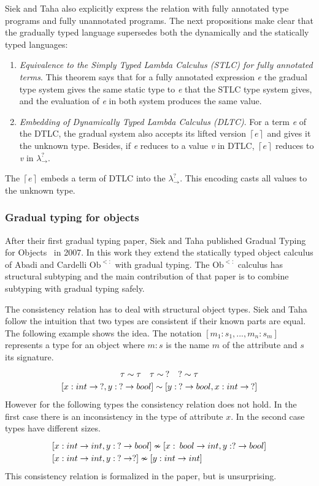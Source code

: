 \documentclass{article}
\newcommand\gstlc[0]{$\lambda^?_{\rightarrow}$}
\newcommand\obj[0]{$\text{Ob}^{<:}$}
\begin{document}
Siek and Taha also explicitly express the relation with fully annotated type programs and fully unannotated programs.  The next propositions make clear that the gradually typed language supersedes both the dynamically and the statically typed languages:
\begin{enumerate}
	\item \emph{Equivalence to the Simply Typed Lambda Calculus (STLC) for fully annotated terms}. This theorem says that for a fully annotated expression \emph{e} the gradual type system gives the same static type to \emph{e} that the STLC type system gives, and the evaluation of \emph{e} in both system produces the same value.
	\item \emph{Embedding of Dynamically Typed Lambda Calculus (DLTC)}. For a term \emph{e} of the DTLC, the gradual system also accepts its lifted version \emph{$\left\lceil e\right\rceil$} and gives it the unknown type. Besides, if \emph{e} reduces to a value \emph{v} in DTLC, \emph{$\left\lceil e\right\rceil$} reduces to \emph{v} in \gstlc.	
\end{enumerate} 
The \emph{$\left\lceil e\right\rceil$} embeds a term of DTLC into the \gstlc. This encoding casts all values to the unknown type. 

\subsubsection{Gradual typing for objects}
After their first gradual typing paper, Siek and Taha published Gradual Typing for Objects~\cite{siekTaha:ecoop2007} in 2007. In this work they extend the statically typed object calculus of Abadi and Cardelli \obj \: \cite{abadiCardelli:otherversion} with gradual typing. The \obj \: calculus has structural subtyping and the main contribution of that paper is to combine subtyping with gradual typing safely.

The consistency relation has to deal with structural object types. Siek and Taha follow the intuition that two types are consistent if their known parts are equal. The following example shows the idea. The notation $[m_1: s_1, ..., m_n : s_m]$ represents a type for an object where $m : s$ is the name $m$ of the attribute and $s$ its signature.
\[
\renewcommand{\arraystretch}{1.2}
\begin{tabular}{c}
$\tau \sim \tau \quad \tau \sim \: ? \quad ? \sim \tau$ \\
$[x: int \rightarrow \:?, y:\:? \rightarrow bool] \sim [y:\: ? \rightarrow bool, x: int \rightarrow \:?]$ 
\end{tabular}
\]
However for the following types the consistency relation does not hold. In the first case there is an inconsistency in the type of attribute $x$. In the second case types have different sizes.
\[
\renewcommand{\arraystretch}{1.2}
\begin{tabular}{l}
$[x: int \rightarrow int, y:\:? \rightarrow bool] \nsim [x:\: bool \rightarrow int, y: ? \rightarrow bool]$ \\
$[x: int \rightarrow int, y:\:? \rightarrow ?] \nsim [y: int \rightarrow int]$ 
\end{tabular}
\]
This consistency relation is formalized in the paper, but is unsurprising.
\end{document}
